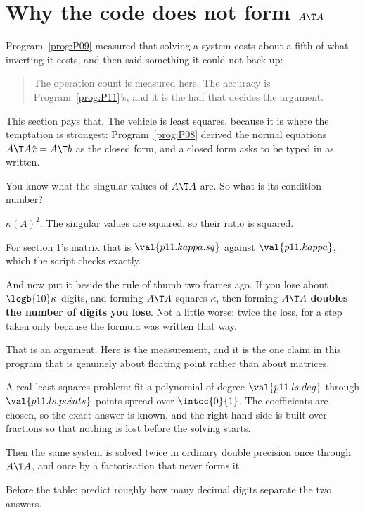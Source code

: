 \section{Why the code does not form \texorpdfstring{$A\T A$}{A transpose A}}
\label{sec:P11-normal}

\begin{fr}
Program~\ref{prog:P09} measured that solving a system costs about a fifth of
what inverting it costs, and then said something it could not back up:

\begin{quote}
The operation count is measured here. The accuracy is Program~\ref{prog:P11}'s,
and it is the half that decides the argument.
\end{quote}

This section pays that. The vehicle is least squares, because it is where the
temptation is strongest: Program~\ref{prog:P08} derived the normal equations
$A\T A\hat{x} = A\T b$ as the closed form, and a closed form asks to be typed
in as written.

You know what the singular values of $A\T A$ are. So what is its condition
number?
\dotline
\nextframe
\end{fr}

\begin{fr}
\begin{ansblock}
$\kappa(A)^{2}$. The singular values are squared, so their ratio is squared.
\end{ansblock}

For section 1's matrix that is $\val{p11.kappa.sq}$ against
$\val{p11.kappa}$, which the script checks exactly.

And now put it beside the rule of thumb two frames ago. If you lose about
$\logb{10}\kappa$ digits, and forming $A\T A$ squares $\kappa$, then forming
$A\T A$ \textbf{doubles the number of digits you lose}. Not a little worse:
twice the loss, for a step taken only because the formula was written that way.
\end{fr}

\begin{fr}
That is an argument. Here is the measurement, and it is the one claim in this
program that is genuinely about floating point rather than about matrices.

A real least-squares problem: fit a polynomial of degree $\val{p11.ls.deg}$
through $\val{p11.ls.points}$ points spread over $\intcc{0}{1}$. The
coefficients are chosen, so the exact answer is known, and the right-hand side
is built over fractions so that nothing is lost before the solving starts.

Then the same system is solved twice in ordinary double precision \dash{} once
through $A\T A$, and once by a factorisation that never forms it.

Before the table: predict roughly how many decimal digits separate the two
answers.
\dotline
\nextframe
\end{fr}

